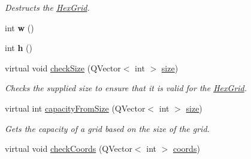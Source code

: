 \begin{DoxyCompactItemize}
\begin{DoxyCompactList}\small\item\em \-Destructs the \hyperlink{classhsom_1_1_hex_grid}{\-Hex\-Grid}. \end{DoxyCompactList}\item 
\hypertarget{classhsom_1_1_quad_grid_a0cdfb7f9c5ce4e36510279f1edf8133b}{int {\bfseries w} ()}\label{classhsom_1_1_quad_grid_a0cdfb7f9c5ce4e36510279f1edf8133b}

\item 
\hypertarget{classhsom_1_1_quad_grid_afe8556629d71bd960710ba566b245c9a}{int {\bfseries h} ()}\label{classhsom_1_1_quad_grid_afe8556629d71bd960710ba566b245c9a}

\item 
\hypertarget{classhsom_1_1_quad_grid_a249f85b1d84a4219ccdd1d42d6a283f3}{virtual void \hyperlink{classhsom_1_1_quad_grid_a249f85b1d84a4219ccdd1d42d6a283f3}{check\-Size} (\-Q\-Vector$<$ int $>$ \hyperlink{classhsom_1_1_grid_a3e846473299eb2c7c259659eb61a6234}{size})}\label{classhsom_1_1_quad_grid_a249f85b1d84a4219ccdd1d42d6a283f3}

\begin{DoxyCompactList}\small\item\em \-Checks the supplied size to ensure that it is valid for the \hyperlink{classhsom_1_1_hex_grid}{\-Hex\-Grid}. \end{DoxyCompactList}\item 
\hypertarget{classhsom_1_1_quad_grid_a426dfe4e7a75f55c01d9e99865941633}{virtual int \hyperlink{classhsom_1_1_quad_grid_a426dfe4e7a75f55c01d9e99865941633}{capacity\-From\-Size} (\-Q\-Vector$<$ int $>$ \hyperlink{classhsom_1_1_grid_a3e846473299eb2c7c259659eb61a6234}{size})}\label{classhsom_1_1_quad_grid_a426dfe4e7a75f55c01d9e99865941633}

\begin{DoxyCompactList}\small\item\em \-Gets the capacity of a grid based on the size of the grid. \end{DoxyCompactList}\item 
\hypertarget{classhsom_1_1_quad_grid_a73f94c48b7544917753883ccd813c9e6}{virtual void \hyperlink{classhsom_1_1_quad_grid_a73f94c48b7544917753883ccd813c9e6}{check\-Coords} (\-Q\-Vector$<$ int $>$ \hyperlink{classhsom_1_1_quad_grid_a8f91269433c403a6034efdec7e97104b}{coords})}\label{classhsom_1_1_quad_grid_a73f94c48b7544917753883ccd813c9e6}


\end{DoxyCompactItemize}
